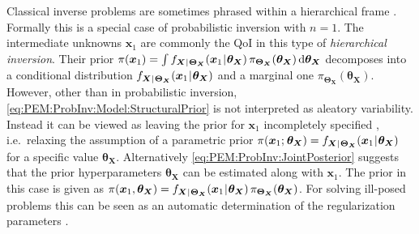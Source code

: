 \par %
Classical inverse problems are sometimes phrased within a hierarchical frame \cite{Multilevel:Malinverno2004,Inversion:Wang2005:b}.
Formally this is a special case of probabilistic inversion with \(n = 1\).
The intermediate unknowns \(\bm{x}_1\) are commonly the QoI in this type of \textit{hierarchical inversion}.
Their prior \(\pi(\bm{x}_1) = \int f_{\bm{X} {\:\!}|{\:\!} \bm{\Theta}_{\bm{X}}} (\bm{x}_1 {\:\!}|{\:\!} \bm{\theta}_{\bm{X}}) \, \pi_{\bm{\Theta}_{\bm{X}}}(\bm{\theta}_{\bm{X}}) \, \mathrm{d} \bm{\theta}_{\bm{X}}\)
decomposes into a conditional distribution \(f_{\bm{X} {\:\!}|{\:\!} \bm{\Theta}_{\bm{X}}} (\bm{x}_1 {\:\!}|{\:\!} \bm{\theta}_{\bm{X}})\) and a marginal one \(\pi_{\bm{\Theta}_{\bm{X}}} (\bm{\theta}_{\bm{X}})\).
However, other than in probabilistic inversion, \cref{eq:PEM:ProbInv:Model:StructuralPrior} is not interpreted as aleatory variability.
Instead it can be viewed as leaving the prior for \(\bm{x}_1\) incompletely specified \cite{Multilevel:Malinverno2004},
i.e.\ relaxing the assumption of a parametric prior \(\pi(\bm{x}_1 ;{\:\!} \bm{\theta}_{\bm{X}}) = f_{\bm{X} {\:\!}|{\:\!} \bm{\Theta}_{\bm{X}}} (\bm{x}_1 {\:\!}|{\:\!} \bm{\theta}_{\bm{X}})\) for a specific value \(\bm{\theta}_{\bm{X}}\).
Alternatively \cref{eq:PEM:ProbInv:JointPosterior} suggests that the prior hyperparameters \(\bm{\theta}_{\bm{X}}\) can be estimated along with \(\bm{x}_1\).
The prior in this case is given as \(\pi(\bm{x}_1,\bm{\theta}_{\bm{X}}) = f_{\bm{X} {\:\!}|{\:\!} \bm{\Theta}_{\bm{X}}} (\bm{x}_1 {\:\!}|{\:\!} \bm{\theta}_{\bm{X}}) \, \pi_{\bm{\Theta}_{\bm{X}}}(\bm{\theta}_{\bm{X}})\).
For solving ill-posed problems this can be seen as an automatic determination of the regularization parameters \cite{Inversion:Wang2005:b}.